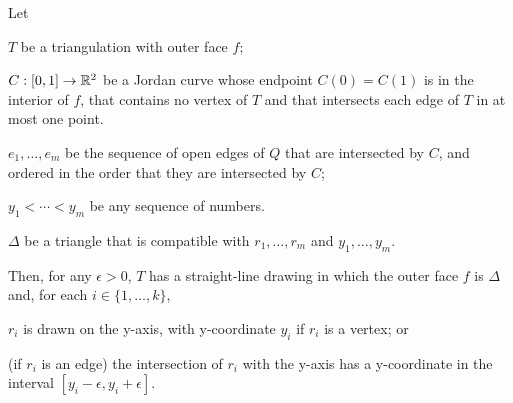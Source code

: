 \documentclass{patmorin}
\begin{document}
\begin{thm}
   Let
   \begin{compactenum}
     \item  $T$ be a triangulation with outer face $f$;
     \item  $C:[0,1]\to\mathbb{R}^2$ be a Jordan curve whose endpoint $C(0)=C(1)$
            is in the interior of $f$, that contains no vertex of $T$
            and that intersects each edge of $T$ in at most one point.
     \item $e_1,\ldots,e_m$ be the sequence of open edges
           of $Q$ that are intersected by $C$, and ordered in the order
           that they are intersected by $C$;
     \item $y_1<\cdots<y_m$ be any sequence of numbers.  
     \item $\Delta$ be a triangle that is compatible with 
           $r_1,\ldots,r_m$ and $y_1,\ldots,y_m$.
  \end{compactenum}
   Then, for any $\epsilon>0$, $T$ has a
   straight-line drawing in which the outer face $f$ is $\Delta$
   and, for each $i\in\{1,\ldots,k\}$, 
   \begin{compactenum}
       \item $r_i$ is drawn on the y-axis, with y-coordinate $y_i$
         if $r_i$ is a vertex; or
       \item (if $r_i$ is an edge) the intersection of $r_i$ with the
         y-axis has a y-coordinate in the interval
         $[y_i-\epsilon,y_i+\epsilon]$.
   \end{compactenum}
\end{thm}
\end{document}
